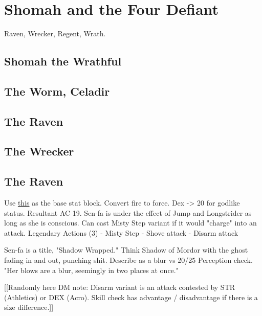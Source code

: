 \section{Shomah and the Four Defiant}\label{sec:celadir}
Raven, Wrecker, Regent, Wrath.

\subsection{Shomah the Wrathful}

\subsection{The Worm, Celadir}

\subsection{The Raven}

\subsection{The Wrecker}

\subsection{The Raven}


Use \href{https://i.imgur.com/HIvPzSj.jpg}{this} as the base stat block.
Convert fire to force.
Dex -> 20 for godlike status.
Resultant AC 19.
Sen-fa is under the effect of Jump and Longstrider as long as she is conscious.
Can cast Misty Step variant if it would "charge" into an attack.
Legendary Actions (3)
- Misty Step
- Shove attack
- Disarm attack

Sen-fa is a title, "Shadow Wrapped."
Think Shadow of Mordor with the ghost fading in and out, punching shit.
Describe as a blur vs 20/25 Perception check.
"Her blows are a blur, seemingly in two places at once."

[[Randomly here DM note:
Disarm variant is an attack contested by STR (Athletics) or DEX (Acro).
Skill check has advantage / disadvantage if there is a size difference.]]


